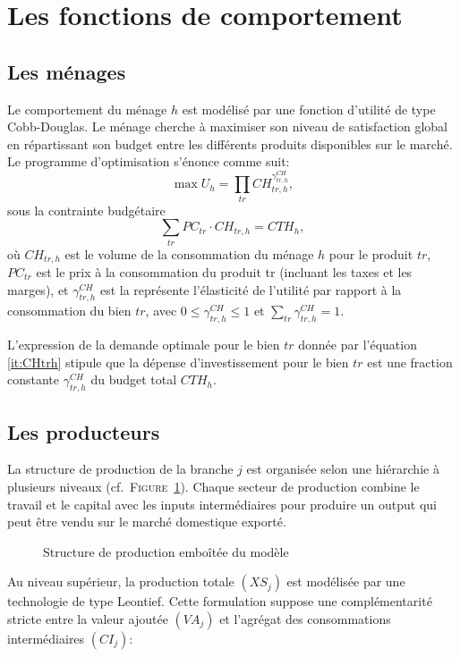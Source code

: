 \documentclass[11pt,a4paper]{article}
\newcommand{\tr}{\mathit{tr}}
\newcommand{\CH}{\mathit{CH}}
\newcommand{\CI}{\mathit{CI}}
\newcommand{\CTH}{\mathit{CTH}}
\newcommand{\PC}{\mathit{PC}}
\newcommand{\VA}{\mathit{VA}}
\newcommand{\XS}{\mathit{XS}}
\begin{document}
	
	
	\section{Les fonctions de comportement}
	\subsection{Les ménages}
	Le comportement du ménage $h$ est modélisé par une fonction d'utilité de type Cobb-Douglas. Le ménage cherche à maximiser son niveau de satisfaction global en répartissant son budget entre les différents produits disponibles sur le marché. Le programme d'optimisation s'énonce comme suit:
	\begin{equation}
		\max U_h = \prod_{\tr}^{} \CH_{tr,h}^{\gamma^{\CH}_{\tr,h}},
	\end{equation}
	sous la contrainte budgétaire
	\begin{equation}
		\sum_{\tr} \PC_{\tr}\cdot\CH_{\tr,h} = \CTH_h,
	\end{equation}
	où $\CH_{\tr,h}$ est le volume de la consommation du ménage $h$ pour le produit $\tr$, $\PC_{\tr}$ est le prix à la consommation du produit tr (incluant les taxes et les marges), et $\gamma^{\CH}_{\tr,h}$ est la représente l'élasticité de l'utilité par rapport à la consommation du bien  $\tr$, avec $0\leq \gamma^{\CH}_{\tr,h}\leq 1 $ et $\sum_{\tr}\gamma^{\CH}_{\tr,h}=1$.
	
	L'expression de la demande optimale pour le bien $\tr$  donnée par l'équation \ref{it:CHtrh} stipule que la dépense d'investissement pour le bien $\tr$ est une fraction constante $\gamma^{\CH}_{\tr,h}$ du budget total $\CTH_h$.
	\subsection{Les producteurs}
	La structure de production de la branche $j$ est organisée selon une hiérarchie à plusieurs niveaux (cf.~\textsc{Figure}~\ref{fig:xsvaci}). Chaque secteur de production combine le travail et le capital avec les inputs intermédiaires pour produire un output qui peut être vendu sur le marché domestique exporté.
	
	
	\begin{figure}[!htbp]
		\centering
		
		\caption{Structure de production emboîtée du modèle}
		\label{fig:xsvaci}
	\end{figure}
	
	
	Au niveau supérieur, la production totale $\left(\XS_{j}\right)$ est modélisée par une technologie de type Leontief. Cette formulation suppose une complémentarité stricte entre la valeur ajoutée $\left(\VA_{j}\right)$ et l'agrégat des consommations intermédiaires $\left(\CI_{j}\right)$: 
	
\end{document}
